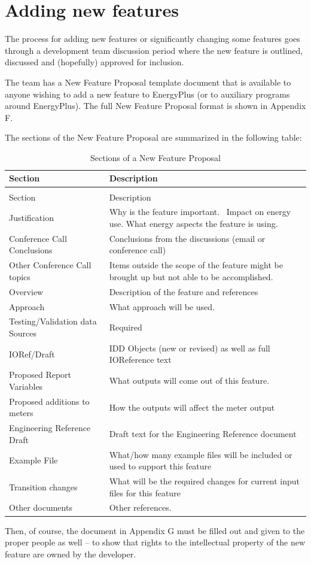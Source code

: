 \section{Adding new features}\label{adding-new-features}

The process for adding new features or significantly changing some features goes through a development team discussion period where the new feature is outlined, discussed and (hopefully) approved for inclusion.

The team has a New Feature Proposal template document that is available to anyone wishing to add a new feature to EnergyPlus (or to auxiliary programs around EnergyPlus). The full New Feature Proposal format is shown in Appendix F.

The sections of the New Feature Proposal are summarized in the following table:

\begin{longtable}[c]{p{1.5in}p{4.5in}}
\caption{Sections of a New Feature Proposal \label{table:sections-of-a-new-feature-proposal}} \tabularnewline
\toprule
Section & Description \tabularnewline
\midrule
\endfirsthead

\caption[]{Sections of a New Feature Proposal} \tabularnewline
\toprule
Section & Description \tabularnewline
\midrule
\endhead

Justification & Why is the feature important.~ Impact on energy use. What energy aspects the feature is using. \tabularnewline
Conference Call Conclusions & Conclusions from the discussions (email or conference call) \tabularnewline
Other Conference Call topics & Items outside the scope of the feature might be brought up but not able to be accomplished. \tabularnewline
Overview & Description of the feature and references \tabularnewline
Approach & What approach will be used. \tabularnewline
Testing/Validation data Sources & Required \tabularnewline
IORef/Draft & IDD Objects (new or revised) as well as full IOReference text \tabularnewline
Proposed Report Variables & What outputs will come out of this feature. \tabularnewline
Proposed additions to meters & How the outputs will affect the meter output \tabularnewline
Engineering Reference Draft & Draft text for the Engineering Reference document \tabularnewline
Example File & What/how many example files will be included or used to support this feature \tabularnewline
Transition changes & What will be the required changes for current input files for this feature \tabularnewline
Other documents & Other references. \tabularnewline
\bottomrule
\end{longtable}

Then, of course, the document in Appendix G must be filled out and given to the proper people as well -- to show that rights to the intellectual property of the new feature are owned by the developer.
